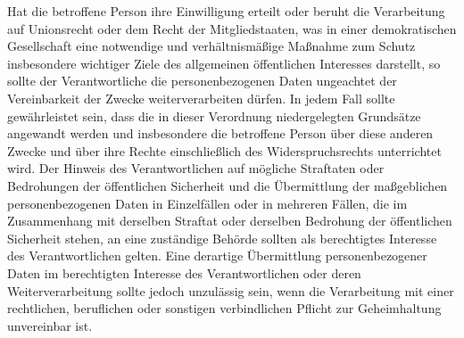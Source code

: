 \begin{enumerate}
    Hat die betroffene Person ihre Einwilligung erteilt oder beruht die Verarbeitung auf Unionsrecht oder dem Recht der
    Mitgliedstaaten, was in einer demokratischen Gesellschaft eine notwendige und verhältnismäßige Maßnahme zum Schutz
    insbesondere wichtiger Ziele des allgemeinen öffentlichen Interesses darstellt, so sollte der Verantwortliche die
    personenbezogenen Daten ungeachtet der Vereinbarkeit der Zwecke weiterverarbeiten dürfen. In jedem Fall sollte
    gewährleistet sein, dass die in dieser Verordnung niedergelegten Grundsätze angewandt werden und insbesondere die
    betroffene Person über diese anderen Zwecke und über ihre Rechte einschließlich des Widerspruchsrechts unterrichtet
    wird. Der Hinweis des Verantwortlichen auf mögliche Straftaten oder Bedrohungen der öffentlichen Sicherheit und die
    Übermittlung der maßgeblichen personenbezogenen Daten in Einzelfällen oder in mehreren Fällen, die im Zusammenhang
    mit derselben Straftat oder derselben Bedrohung der öffentlichen Sicherheit stehen, an eine zuständige Behörde
    sollten als berechtigtes Interesse des Verantwortlichen gelten. Eine derartige Übermittlung personenbezogener Daten
    im berechtigten Interesse des Verantwortlichen oder deren Weiterverarbeitung sollte jedoch unzulässig sein, wenn
    die Verarbeitung mit einer rechtlichen, beruflichen oder sonstigen verbindlichen Pflicht zur Geheimhaltung
    unvereinbar ist.%
   \label{itm:eg-50}
   


\end{enumerate}

